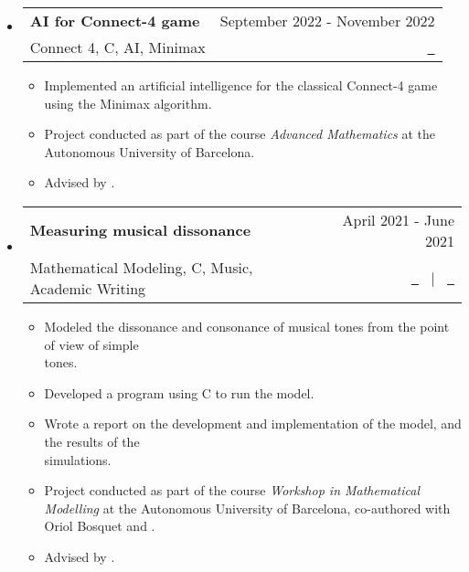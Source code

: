 \documentclass[a4paper,11pt]{article}
\makeatletter
\newcommand{\resumeQuadHeading}[4]{
  \item
  \begin{tabular*}{0.96\textwidth}[t]{l@{\extracolsep{\fill}}r}
    \textbf{#1} & \small #2 \\
    \small#3 & \small #4 \\
  \end{tabular*}
}
\newcommand{\resumeHeadingListStart}{
  \begin{itemize}[leftmargin=0.15in, label={}]
}
\newcommand{\resumeHeadingListEnd}{\end{itemize}}
\makeatother
\begin{document}
\resumeHeadingListStart{}
\resumeQuadHeading{AI for Connect-4 game}{September 2022 - November 2022}{Connect 4, C, AI, Minimax}{\href{https://github.com/victorballester7/connect4}{\faGithub \ \graydotuline{Code}}}
\begin{itemize}[leftmargin=3em, itemsep=0.1em, topsep=2pt]
  \item \small Implemented an artificial intelligence for the classical Connect-4 game using the Minimax algorithm.
  \item \small Project conducted as part of the course \textit{Advanced Mathematics} at the Autonomous University of Barcelona.
  \item \small Advised by \href{https://portalrecerca.uab.cat/en/persons/vicente-soler-ruz}{}.
\end{itemize}
\resumeHeadingListEnd{}


\resumeHeadingListStart{}
\resumeQuadHeading{Measuring musical dissonance}{April 2021 - June 2021}{Mathematical Modeling, C, Music, Academic Writing}{\href{https://github.com/victorballester7/dissonance/blob/main/latex/main.pdf}{\faFileTextO \ \graydotuline{{Report \scriptsize (in Catalan)}}} \ $|$ \ \href{https://github.com/victorballester7/dissonance}{\faGithub \ \graydotuline{Code}}}
\begin{itemize}[leftmargin=3em, itemsep=0.1em, topsep=2pt]
  \item \small Modeled the dissonance and consonance of musical tones from the point of view of simple\\ tones.
  \item \small Developed a program using C to run the model.
  \item \small Wrote a report on the development and implementation of the model, and the results of the\\ simulations.
  \item \small Project conducted as part of the course \textit{Workshop in Mathematical Modelling} at the Autonomous University of Barcelona, co-authored with Oriol Bosquet and \href{https://github.com/carlosala}{}.
  \item \small Advised by \href{https://mat.uab.cat/departament/uab/pop_ex.php?id=208&lang=}{}.
\end{itemize}
\resumeHeadingListEnd{}
\end{document}
